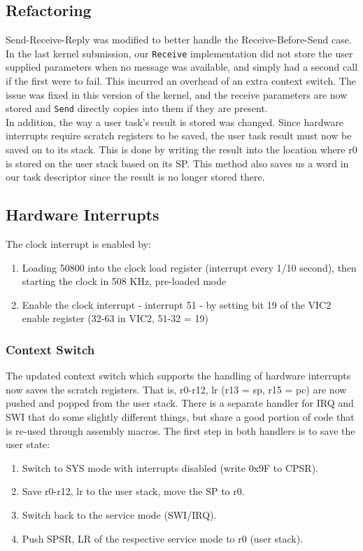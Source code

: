 \documentclass[12pt]{article}
\begin{document}
\subsection{Refactoring}
Send-Receive-Reply was modified to better handle the Receive-Before-Send case. In the last kernel submission, our \texttt{Receive} implementation did not store the user supplied parameters when no message was available, and simply had a second call if the first were to fail. This incurred an overhead of an extra context switch. The issue was fixed in this version of the kernel, and the receive parameters are now stored and \texttt{Send} directly copies into them if they are present.
\\
In addition, the way a user task's result is stored was changed. Since hardware interrupts require scratch registers to be saved, the user task result must now be saved on to its stack. This is done by writing the result into the location where r0 is stored on the user stack based on its SP. This method also saves us a word in our task descriptor since the result is no longer stored there.
\subsection{Hardware Interrupts}
The clock interrupt is enabled by:
\begin{enumerate}
    \item Loading 50800 into the clock load register (interrupt every 1/10 second), then starting the clock in 508 KHz, pre-loaded mode
    \item Enable the clock interrupt - interrupt 51 - by setting bit 19 of the VIC2 enable register (32-63 in VIC2, 51-32 = 19)
    \\[1\baselineskip]
\end{enumerate}
\subsubsection{Context Switch}
The updated context switch which supports the handling of hardware interrupts now saves the scratch registers. That is, {r0-r12, lr} (r13 = sp, r15 = pc) are now pushed and popped from the user stack. There is a separate handler for IRQ and SWI that do some slightly different things, but share a good portion of code that is re-used through assembly macros. The first step in both handlers is to save the user state:
\begin{enumerate}
    \item Switch to SYS mode with interrupts disabled (write 0x9F to CPSR).
    \item Save {r0-r12, lr} to the user stack, move the SP to r0.
    \item Switch back to the service mode (SWI/IRQ).
    \item Push SPSR, LR of the respective service mode to r0 (user stack).
\end{enumerate}
\end{document}
